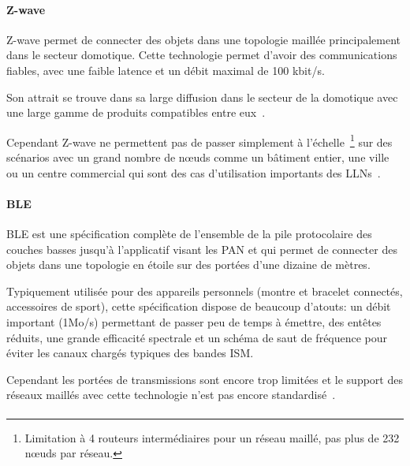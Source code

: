 \paragraph{Z-wave}

Z-wave permet de connecter des objets dans une topologie maillée principalement dans le secteur domotique.
Cette technologie permet d'avoir des communications fiables, avec une faible latence et un débit maximal de 100 kbit/s.

Son attrait se trouve dans sa large diffusion dans le secteur de la domotique avec une large gamme de produits compatibles entre eux~\cite{zwaveCritic}.

Cependant Z-wave ne permettent pas de passer simplement à l'échelle~\footnote{Limitation à 4 routeurs intermédiaires pour un réseau maillé, pas plus de 232 nœuds par réseau.} sur des scénarios avec un grand nombre de nœuds comme un bâtiment entier, une ville ou un centre commercial qui sont des cas d'utilisation importants des \ac{LLN}s~\cite{zwaveCritic}.

\paragraph{\ac{BLE}}

\ac{BLE} est une spécification complète de l'ensemble de la pile protocolaire des couches basses jusqu'à l'applicatif visant les \ac{PAN} et qui permet de connecter des objets dans une topologie en étoile sur des portées d'une dizaine de mètres.

Typiquement utilisée pour des appareils personnels (montre et bracelet connectés, accessoires de sport), cette spécification dispose de beaucoup d'atouts: un débit important (1Mo/s) permettant de passer peu de temps à émettre, des entêtes réduits, une grande efficacité spectrale et un schéma de saut de fréquence pour éviter les canaux chargés typiques des bandes \ac{ISM}.

Cependant les portées de transmissions sont encore trop limitées et le support des réseaux maillés avec cette technologie n'est pas encore standardisé~\cite{bleCritic}.

\paragraph{\ieee{}}

